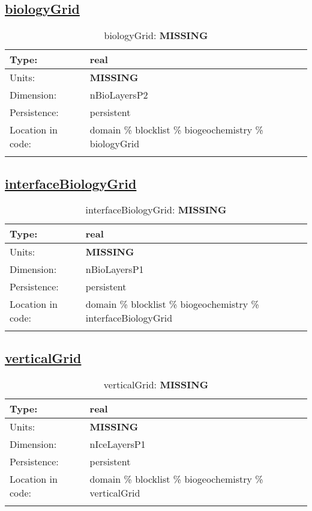 \subsection[biologyGrid]{\hyperref[sec:var_tab_biogeochemistry]{biologyGrid}}
\label{subsec:var_sec_biogeochemistry_biologyGrid}
\begin{center}
\begin{longtable}{| p{2.0in} | p{4.0in} |}
        \hline 
        Type: & real \\
        \hline 
        Units: & {\bf \color{red} MISSING} \\
        \hline 
        Dimension: & nBioLayersP2 \\
        \hline 
        Persistence: & persistent \\
        \hline 
         Location in code: & domain \% blocklist \% biogeochemistry \% biologyGrid \\
         \hline 
    \caption{biologyGrid: {\bf \color{red} MISSING}}
\end{longtable}
\end{center}
\subsection[interfaceBiologyGrid]{\hyperref[sec:var_tab_biogeochemistry]{interfaceBiologyGrid}}
\label{subsec:var_sec_biogeochemistry_interfaceBiologyGrid}
\begin{center}
\begin{longtable}{| p{2.0in} | p{4.0in} |}
        \hline 
        Type: & real \\
        \hline 
        Units: & {\bf \color{red} MISSING} \\
        \hline 
        Dimension: & nBioLayersP1 \\
        \hline 
        Persistence: & persistent \\
        \hline 
         Location in code: & domain \% blocklist \% biogeochemistry \% interfaceBiologyGrid \\
         \hline 
    \caption{interfaceBiologyGrid: {\bf \color{red} MISSING}}
\end{longtable}
\end{center}
\subsection[verticalGrid]{\hyperref[sec:var_tab_biogeochemistry]{verticalGrid}}
\label{subsec:var_sec_biogeochemistry_verticalGrid}
\begin{center}
\begin{longtable}{| p{2.0in} | p{4.0in} |}
        \hline 
        Type: & real \\
        \hline 
        Units: & {\bf \color{red} MISSING} \\
        \hline 
        Dimension: & nIceLayersP1 \\
        \hline 
        Persistence: & persistent \\
        \hline 
         Location in code: & domain \% blocklist \% biogeochemistry \% verticalGrid \\
         \hline 
    \caption{verticalGrid: {\bf \color{red} MISSING}}
\end{longtable}
\end{center}
